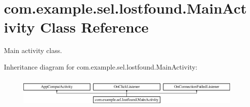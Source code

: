 \hypertarget{classcom_1_1example_1_1sel_1_1lostfound_1_1MainActivity}{}\section{com.\+example.\+sel.\+lostfound.\+Main\+Activity Class Reference}
\label{classcom_1_1example_1_1sel_1_1lostfound_1_1MainActivity}


Main activity class.  


Inheritance diagram for com.\+example.\+sel.\+lostfound.\+Main\+Activity\+:\begin{figure}[H]
\begin{center}
\leavevmode
\includegraphics[height=1.542700cm]{classcom_1_1example_1_1sel_1_1lostfound_1_1MainActivity}
\end{center}
\end{figure}
